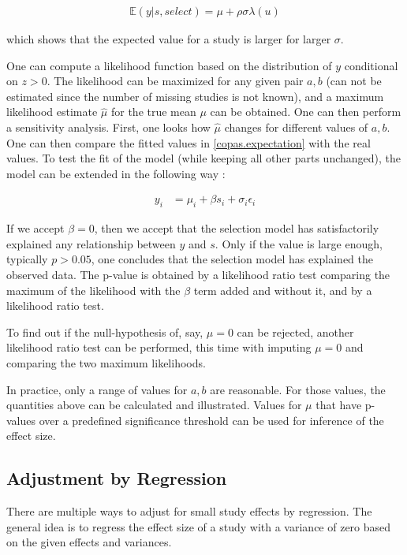 \documentclass[11pt,a4paper,twoside]{book}\usepackage[]{graphicx}\usepackage[]{color}
\begin{document}
\begin{align}
\mathbb{E}(y|s, select) = \mu + \rho\sigma\lambda(u) \label{copas.expectation}
\end{align}

which shows that the expected value for a study is larger for larger $\sigma$. 

\vspace{0mm}
One can compute a likelihood function based on the distribution of $y$ conditional on $z > 0$. The likelihood can be maximized for any given pair $a,b$ (can not be estimated since the number of missing studies is not known), and a maximum likelihood estimate $\hat{\mu}$ for the true mean $\mu$ can be obtained. One can then perform a sensitivity analysis. First, one looks how $\hat{\mu}$ changes for different values of $a,b$. One can then compare the fitted values in \ref{copas.expectation} with the real values. To test the fit of the model (while keeping all other parts unchanged), the model can be extended in the following way :

\begin{align}
y_{i} &= \mu_{i} + \beta s_{i} + \sigma_{i}\epsilon_{i}
\end{align}

If we accept $\beta = 0$, then we accept that the selection model has satisfactorily explained any relationship between $y$ and $s$. Only if the value is large enough, typically $p > 0.05$, one concludes that the selection model has explained the observed data. The p-value is obtained by a likelihood ratio test comparing the maximum of the likelihood with the $\beta$ term added and without it, and by a likelihood ratio test.

\vspace{0mm}
To find out if the null-hypothesis of, say, $\mu = 0$ can be rejected, another likelihood ratio test can be performed, this time with imputing $\mu = 0$ and comparing the two maximum likelihoods.

\vspace{0mm}
In practice, only a range of values for $a,b$ are reasonable. For those values, the quantities above can be calculated and illustrated. Values for $\mu$ that have p-values over a predefined significance threshold can be used for inference of the effect size. 

\subsection{Adjustment by Regression}
There are multiple ways to adjust for small study effects by regression. The general idea is to regress the effect size of a study with a variance of zero based on the given effects and variances. 
\end{document}
